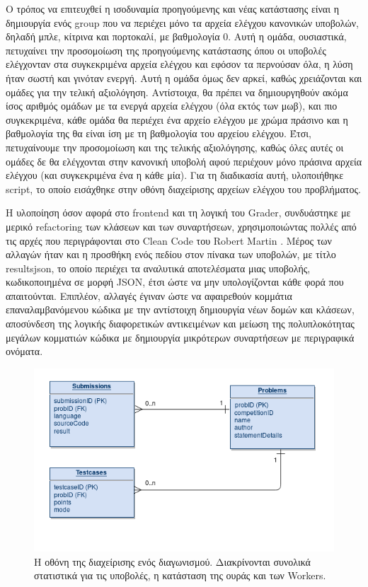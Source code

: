 \documentclass[diploma]{softlab-thesis}
\begin{document}
\bigskip

Ο τρόπος να επιτευχθεί η ισοδυναμία προηγούμενης και νέας κατάστασης είναι η
δημιουργία ενός group που να περιέχει μόνο τα αρχεία ελέγχου κανονικών
υποβολών, δηλαδή μπλε, κίτρινα και πορτοκαλί, με βαθμολογία 0. Αυτή η ομάδα,
ουσιαστικά, πετυχαίνει την προσομοίωση της προηγούμενης κατάστασης όπου οι
υποβολές ελέγχονταν στα συγκεκριμένα αρχεία ελέγχου και εφόσον τα περνούσαν
όλα, η λύση ήταν σωστή και γινόταν ενεργή. Αυτή η ομάδα όμως δεν αρκεί, καθώς
χρειάζονται και ομάδες για την τελική αξιολόγηση. Αντίστοιχα, θα πρέπει να
δημιουργηθούν ακόμα ίσος αριθμός ομάδων με τα ενεργά αρχεία ελέγχου (όλα εκτός
των μωβ), και πιο συγκεκριμένα, κάθε ομάδα θα περιέχει ένα αρχείο ελέγχου με
χρώμα πράσινο και η βαθμολογία της θα είναι ίση με τη βαθμολογία του αρχείου
ελέγχου. Έτσι, πετυχαίνουμε την προσομοίωση και της τελικής αξιολόγησης, καθώς
όλες αυτές οι ομάδες δε θα ελέγχονται στην κανονική υποβολή αφού περιέχουν μόνο
πράσινα αρχεία ελέγχου (και συγκεκριμένα ένα η κάθε μία). Για τη διαδικασία
αυτή, υλοποιήθηκε script, το οποίο εισάχθηκε στην οθόνη διαχείρισης αρχείων
ελέγχου του προβλήματος.

\bigskip

Η υλοποίηση όσον αφορά στο frontend και τη λογική του Grader, συνδυάστηκε με
μερικό refactoring των κλάσεων και των συναρτήσεων, χρησιμοποιώντας πολλές από
τις αρχές που περιγράφονται στο Clean Code του Robert Martin
\cite{martin2009clean}. Μέρος των αλλαγών ήταν και η προσθήκη ενός πεδίου στον
πίνακα των υποβολών, με τίτλο resultsjson, το οποίο περιέχει τα αναλυτικά
αποτελέσματα μιας υποβολής, κωδικοποιημένα σε μορφή JSON, έτσι ώστε να μην
υπολογίζονται κάθε φορά που απαιτούνται. Επιπλέον, αλλαγές έγιναν ώστε να
αφαιρεθούν κομμάτια επαναλαμβανόμενου κώδικα με την αντίστοιχη δημιουργία νέων
δομών και κλάσεων, αποσύνδεση της λογικής διαφορετικών αντικειμένων και μείωση
της πολυπλοκότητας μεγάλων κομματιών κώδικα με δημιουργία μικρότερων
συναρτήσεων με περιγραφικά ονόματα.

\bigskip

\begin{figure}
  \centering
  \includegraphics[scale=0.3,trim=4 4 4 4,clip]{Figures/groupsbefore.png}
  \caption[Οθόνη διαχείρισης προβλήματος]{Η οθόνη της διαχείρισης ενός διαγωνισμού.
  Διακρίνονται συνολικά στατιστικά για τις υποβολές, η κατάσταση της ουράς και των
  Workers.}
\end{figure}
\end{document}
